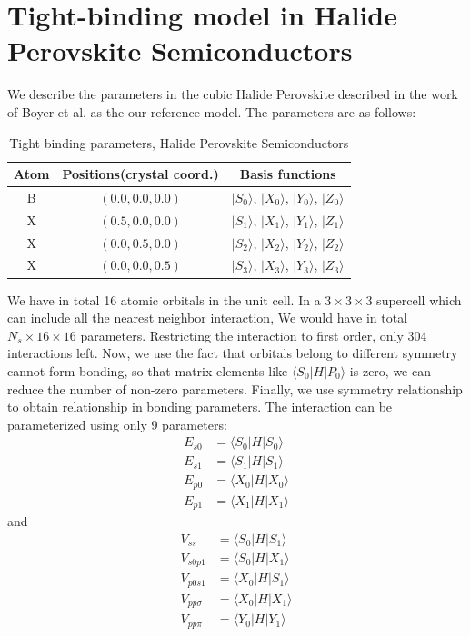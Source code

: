 \documentclass{article}
\begin{document}
\section{Tight-binding model in Halide Perovskite Semiconductors}
We describe the parameters in the cubic Halide Perovskite described in 
the work of Boyer et al.\cite{boyer-richard_symmetry-based_2016} as the 
our reference model. The parameters are as follows:
\begin{table}[h]
    \centering
    \caption{Tight binding parameters, Halide Perovskite Semiconductors}
    \label{T:TBP}
    \begin{tabular}{|c|c|c|}
        \hline
        Atom & Positions(crystal coord.) & Basis functions \\
        \hline
        B & $(0.0,0.0,0.0)$ & $|S_0\rangle$, $|X_0\rangle$, $|Y_0\rangle$, $|Z_0\rangle$ \\
        X & $(0.5,0.0,0.0)$ & $|S_1\rangle$, $|X_1\rangle$, $|Y_1\rangle$, $|Z_1\rangle$ \\
        X & $(0.0,0.5,0.0)$ & $|S_2\rangle$, $|X_2\rangle$, $|Y_2\rangle$, $|Z_2\rangle$ \\
        X & $(0.0,0.0,0.5)$ & $|S_3\rangle$, $|X_3\rangle$, $|Y_3\rangle$, $|Z_3\rangle$ \\
        \hline
    \end{tabular}
\end{table}
We have in total 16 atomic orbitals in the unit cell. In a $3\times 3\times 3$ supercell
which can include all the nearest neighbor interaction, We would have in total $N_s \times 16 \times 16$ parameters. 
Restricting the interaction to first order, only 304 interactions left. 
Now, we use the fact that orbitals belong to different symmetry cannot form bonding, 
so that matrix elements like $\langle S_0 | H | P_0 \rangle$ is zero, we can reduce the 
number of non-zero parameters. 
Finally, we use symmetry relationship to obtain relationship in bonding parameters. 
The interaction can be parameterized using only 9 parameters:
\begin{align*}
    E_{s0} &= \langle S_0 | H | S_0 \rangle \\
    E_{s1} &= \langle S_1 | H | S_1 \rangle \\
    E_{p0} &= \langle X_0 | H | X_0 \rangle \\
    E_{p1} &= \langle X_1 | H | X_1 \rangle 
\end{align*}
and 
\begin{align*}
    V_{ss} &= \langle S_0 | H | S_1 \rangle  \\
    V_{s0p1} &= \langle S_0 | H | X_1 \rangle \\
    V_{p0s1} &= \langle X_0 | H | S_1 \rangle \\
    V_{pp\sigma} &= \langle X_0 | H | X_1 \rangle \\
    V_{pp\pi} &= \langle Y_0 | H | Y_1 \rangle \\
\end{align*}




\printbibliography[title={Reference}]
\end{document}

